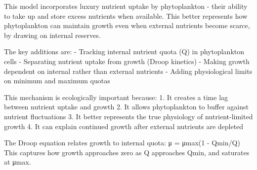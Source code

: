 This model incorporates luxury nutrient uptake by phytoplankton - their ability to take up and store excess nutrients when available. This better represents how phytoplankton can maintain growth even when external nutrients become scarce, by drawing on internal reserves.

The key additions are:
- Tracking internal nutrient quota (Q) in phytoplankton cells
- Separating nutrient uptake from growth (Droop kinetics)
- Making growth dependent on internal rather than external nutrients
- Adding physiological limits on minimum and maximum quotas

This mechanism is ecologically important because:
1. It creates a time lag between nutrient uptake and growth
2. It allows phytoplankton to buffer against nutrient fluctuations
3. It better represents the true physiology of nutrient-limited growth
4. It can explain continued growth after external nutrients are depleted

The Droop equation relates growth to internal quota: μ = μmax(1 - Qmin/Q)
This captures how growth approaches zero as Q approaches Qmin, and saturates at μmax.
